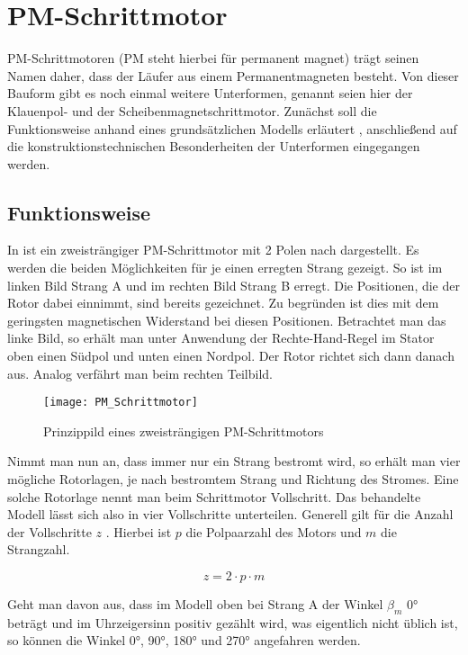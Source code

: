 \section{PM-Schrittmotor}

PM-Schrittmotoren (PM steht hierbei für permanent magnet) trägt seinen Namen daher, dass der Läufer aus einem Permanentmagneten besteht. Von dieser Bauform gibt es noch einmal weitere Unterformen, genannt seien hier der Klauenpol- und der Scheibenmagnetschrittmotor. Zunächst soll die Funktionsweise anhand eines grundsätzlichen Modells erläutert , anschließend auf die konstruktionstechnischen Besonderheiten der Unterformen eingegangen werden.

\subsection{Funktionsweise}

In  ist ein zweisträngiger PM-Schrittmotor mit 2 Polen nach \cite{Schroeder2007} dargestellt. Es werden die beiden Möglichkeiten für je einen erregten Strang gezeigt. So ist im linken Bild Strang A und im rechten Bild Strang B erregt. Die Positionen, die der Rotor dabei einnimmt, sind bereits gezeichnet. Zu begründen ist dies mit dem geringsten magnetischen Widerstand bei diesen Positionen. Betrachtet man das linke Bild, so erhält man unter Anwendung der Rechte-Hand-Regel im Stator oben einen Südpol und unten einen Nordpol. Der Rotor richtet sich dann danach aus. Analog verfährt man beim rechten Teilbild.

\begin{figure}[H]
\centering
\texttt{[image: PM\_Schrittmotor]}
\caption{Prinzippild eines zweisträngigen PM-Schrittmotors}
\label{fig:PM_Schrittmotor}
\end{figure}

Nimmt man nun an, dass immer nur ein Strang bestromt wird, so erhält man vier mögliche Rotorlagen, je nach bestromtem Strang und Richtung des Stromes. Eine solche Rotorlage nennt man beim Schrittmotor Vollschritt. Das behandelte Modell lässt sich also in vier Vollschritte unterteilen. Generell gilt für die Anzahl der Vollschritte $z$ . Hierbei ist $p$ die Polpaarzahl des Motors und $m$ die Strangzahl.

\begin{equation}
z=2 \cdot p \cdot m
\label{eq:vollschritt}
\end{equation}

Geht man davon aus, dass im Modell oben bei Strang A der Winkel $\beta_{m}$ 0° beträgt und im Uhrzeigersinn positiv gezählt wird, was eigentlich nicht üblich ist, so können die Winkel 0°, 90°, 180° und 270° angefahren werden.

